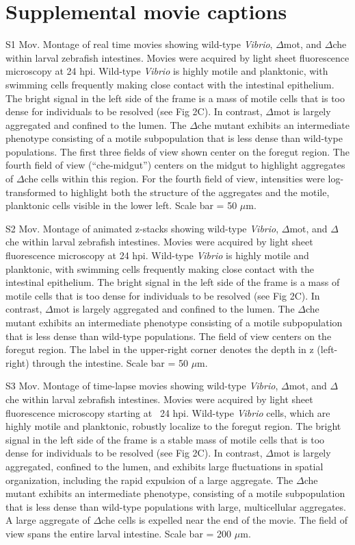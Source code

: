 {{{{{{{{{{{\newpage

\section{Supplemental movie captions}

S1 Mov. Montage of real time movies showing wild-type \textit{Vibrio}, $\Delta$mot, and $\Delta$che within larval zebrafish intestines. 
Movies were acquired by light sheet fluorescence microscopy at 24 hpi. Wild-type \textit{Vibrio} is highly motile and planktonic, with swimming cells frequently making close contact with the intestinal epithelium. The bright signal in the left side of the frame is a mass of motile cells that is too dense for individuals to be resolved (see Fig 2C). In contrast, $\Delta$mot is largely aggregated and confined to the lumen. The $\Delta$che mutant exhibits an intermediate phenotype consisting of a motile subpopulation that is less dense than wild-type populations. The first three fields of view shown center on the foregut region. The fourth field of view (``che-midgut'') centers on the midgut to highlight aggregates of $\Delta$che cells within this region. For the fourth field of view, intensities were log-transformed to highlight both the structure of the aggregates and the motile, planktonic cells visible in the lower left. Scale bar = 50 $\mu$m. 

S2 Mov. Montage of animated z-stacks showing wild-type \textit{Vibrio}, $\Delta$mot, and $\Delta$che within larval zebrafish intestines. 
Movies were acquired by light sheet fluorescence microscopy at 24 hpi. Wild-type \textit{Vibrio} is highly motile and planktonic, with swimming cells frequently making close contact with the intestinal epithelium. The bright signal in the left side of the frame is a mass of motile cells that is too dense for individuals to be resolved (see Fig 2C). In contrast, $\Delta$mot is largely aggregated and confined to the lumen. The $\Delta$che mutant exhibits an intermediate phenotype consisting of a motile subpopulation that is less dense than wild-type populations. The field of view centers on the foregut region. The label in the upper-right corner denotes the depth in z (left-right) through the intestine. Scale bar = 50 $\mu$m. 

S3 Mov. Montage of time-lapse movies showing wild-type \textit{Vibrio}, $\Delta$mot, and $\Delta$che within larval zebrafish intestines. 
Movies were acquired by light sheet fluorescence microscopy starting at ~24 hpi. Wild-type \textit{Vibrio} cells, which are highly motile and planktonic, robustly localize to the foregut region. The bright signal in the left side of the frame is a stable mass of motile cells that is too dense for individuals to be resolved (see Fig 2C). In contrast, $\Delta$mot is largely aggregated, confined to the lumen, and exhibits large fluctuations in spatial organization, including the rapid expulsion of a large aggregate. The $\Delta$che mutant exhibits an intermediate phenotype, consisting of a motile subpopulation that is less dense than wild-type populations with large, multicellular aggregates. A large aggregate of $\Delta$che cells is expelled near the end of the movie. The field of view spans the entire larval intestine. Scale bar = 200 $\mu$m. 

}}}}}}}}}}}
